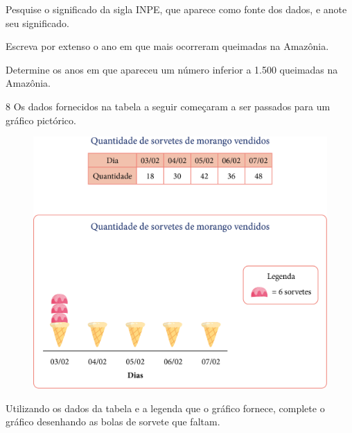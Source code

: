 
\begin{escolha}
\item
  Pesquise o significado da sigla INPE, que aparece como fonte dos dados,
  e anote seu significado.

\item
  Escreva por extenso o ano em que mais ocorreram queimadas na Amazônia.

\item
  Determine os anos em que apareceu um número inferior a 1.500 queimadas na
  Amazônia.
\end{escolha}

\num{8} Os dados fornecidos na tabela a seguir começaram a ser passados para um
gráfico pictórico.

\begin{figure}[htpb!]
\centering
\includegraphics[width=\textwidth]{media/image47.png}
\end{figure}

Utilizando os dados da tabela e a legenda que o gráfico fornece,
complete o gráfico desenhando as bolas de sorvete que faltam.


